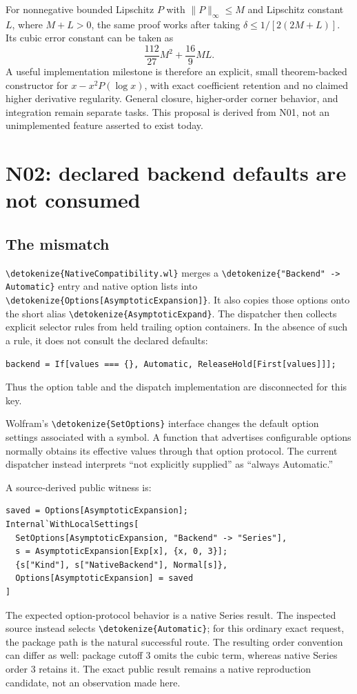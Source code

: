 \documentclass[11pt,a4paper]{article}
\newcommand{\wl}[1]{\texttt{\expandafter\nolinkurl\expandafter{\detokenize{#1}}}}
\begin{document}
For nonnegative bounded Lipschitz $P$ with $\|P\|_\infty\le M$ and Lipschitz
constant $L$, where $M+L>0$, the same proof works after taking
$\delta\le1/[2(2M+L)]$. Its cubic error constant can be taken as
\[
 \frac{112}{27}M^2+\frac{16}{9}ML.
\]
A useful implementation milestone is therefore an explicit, small theorem-backed
constructor for $x-x^2P(\log x)$, with exact coefficient retention and no claimed
higher derivative regularity. General closure, higher-order corner behavior,
and integration remain separate tasks. This proposal is derived from N01, not
an unimplemented feature asserted to exist today.

\section{N02: declared backend defaults are not consumed}\label{sec:defaults}

\subsection{The mismatch}

\wl{NativeCompatibility.wl} merges a \wl{"Backend" -> Automatic} entry and
native option lists into \wl{Options[AsymptoticExpansion]}. It also copies those
options onto the short alias \wl{AsymptoticExpand}. The dispatcher then collects
explicit selector rules from held trailing option containers. In the absence of
such a rule, it does not consult the declared defaults:
\begin{lstlisting}
backend = If[values === {}, Automatic, ReleaseHold[First[values]]];
\end{lstlisting}
Thus the option table and the dispatch implementation are disconnected for this
key.\cite{native}

Wolfram's \wl{SetOptions} interface changes the default option settings associated
with a symbol. A function that advertises configurable options normally obtains
its effective values through that option protocol. The current dispatcher
instead interprets ``not explicitly supplied'' as ``always Automatic.''
\cite{wlsetoptions}

A source-derived public witness is:
\begin{lstlisting}
saved = Options[AsymptoticExpansion];
Internal`WithLocalSettings[
  SetOptions[AsymptoticExpansion, "Backend" -> "Series"],
  s = AsymptoticExpansion[Exp[x], {x, 0, 3}];
  {s["Kind"], s["NativeBackend"], Normal[s]},
  Options[AsymptoticExpansion] = saved
]
\end{lstlisting}
The expected option-protocol behavior is a native Series result. The inspected
source instead selects \wl{Automatic}; for this ordinary exact request, the
package path is the natural successful route. The resulting order convention
can differ as well: package cutoff $3$ omits the cubic term, whereas native
Series order $3$ retains it. The exact public result remains a native
reproduction candidate, not an observation made here.\cite{core,native,wlseries}
\end{document}
